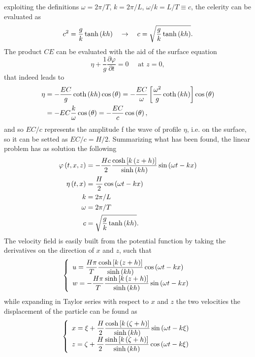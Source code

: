 exploiting the definitions $\omega=2\pi/T$, $k=2\pi/L$, $\omega/k=L/T\equiv c$, the celerity can be evaluated as
\begin{equation}
c^{2}=\dfrac{g}{k}\tanh\left( kh \right)\quad \rightarrow\quad c=\sqrt{\dfrac{g}{k}\tanh\left( kh \right)}.
\end{equation}
The product $CE$ can be evaluated with the aid of the surface equation
\begin{equation*}
\eta + \dfrac{1}{g}\dfrac{\partial \varphi}{\partial t}=0 \quad \text{ at } z=0,
\end{equation*}
that indeed leads to
\begin{align*}
\eta&=-\dfrac{EC}{g}\coth\left( k  h \right)\cos\left( \theta \right)=-\dfrac{EC}{\omega}\left[ \dfrac{\omega^{2}}{g}\coth\left( k  h \right) \right]\cos\left( \theta \right)\\
&=-EC\dfrac{k}{\omega}\cos\left( \theta \right)=-\dfrac{EC}{c}\cos\left( \theta \right),
\end{align*}
and so $EC/c$ represents the amplitude f the wave of profile $\eta$, i.e. on the surface, so it can be setted as $EC/c=H/2$. Summarizing what has been found, the linear problem has as solution the following 
\begin{align}
\varphi\left( t,x,z \right)&=-\dfrac{Hc}{2}\dfrac{\cosh\left[ k \left( z+h \right) \right]}{\sinh\left( k  h \right)}\sin\left( \omega t -kx \right)\\
\eta\left( t,x \right)&=\dfrac{H}{2}\cos\left( \omega t -kx \right)\\
k&=2\pi/L\\
\omega&=2\pi/T\\
c&=\sqrt{\dfrac{g}{k}\tanh\left( kh \right)}.
\end{align}
The velocity field is easily built from the potential function by taking the derivatives on the direction of $x$ and $z$, such that 
\begin{equation}
\left\lbrace\begin{array}{l}
u=\dfrac{H\pi}{T}\dfrac{\cosh\left[ k \left( z+h \right) \right]}{\sinh\left( k  h \right)}\cos\left( \omega t -kx \right)\\
w=-\dfrac{H\pi}{T}\dfrac{\sinh\left[ k \left( z+h \right) \right]}{\sinh\left( k  h \right)}\sin\left( \omega t -kx \right)\\
\end{array}\right.
\end{equation}
while expanding in Taylor series with respect to $x$ and $z$ the two velocities the displacement of the particle can be found as
\begin{equation}
\left\lbrace\begin{array}{l}
x=\xi + \dfrac{H}{2}\dfrac{\cosh\left[ k \left( \zeta+h \right) \right]}{\sinh\left( k  h \right)}\sin\left( \omega t-k\xi \right)\\
z=\zeta+\dfrac{H}{2}\dfrac{\sinh\left[ k \left( \zeta+h \right) \right]}{\sinh\left( k  h \right)}\cos\left( \omega t-k\xi \right)\\
\end{array}\right.
\end{equation}
